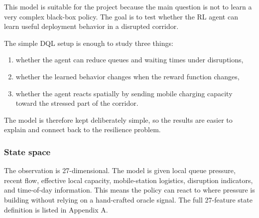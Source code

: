 \documentclass[11pt]{article}
\providecommand{\tightlist}{%
      \setlength{\itemsep}{0pt}\setlength{\parskip}{0pt}}
\begin{document}
This model is suitable for the project because the main question is not
to learn a very complex black-box policy. The goal is to test whether
the RL agent can learn useful deployment behavior in a disrupted
corridor.

The simple DQL setup is enough to study three things:

\begin{enumerate}
\def\labelenumi{\arabic{enumi}.}
\tightlist
\item
  whether the agent can reduce queues and waiting times under
  disruptions,
\item
  whether the learned behavior changes when the reward function changes,
\item
  whether the agent reacts spatially by sending mobile charging capacity
  toward the stressed part of the corridor.
\end{enumerate}

The model is therefore kept deliberately simple, so the results are
easier to explain and connect back to the resilience problem.

    \subsubsection{State space}\label{state-space}

The observation is 27-dimensional. The model is given local queue
pressure, recent flow, effective local capacity, mobile-station
logistics, disruption indicators, and time-of-day information. This
means the policy can react to where pressure is building without relying
on a hand-crafted oracle signal. The full 27-feature state definition is
listed in Appendix A.
\end{document}
